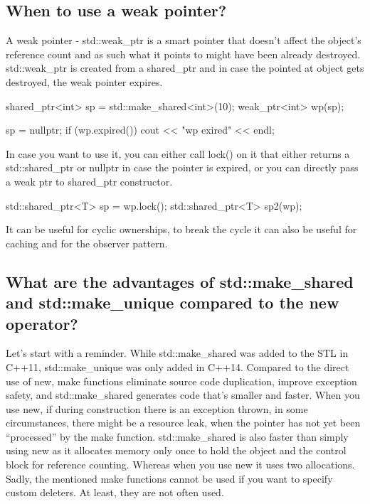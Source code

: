 \documentclass{report}
\begin{document}
\subsection{When to use a weak pointer?}
\bigbreak \noindent 
A weak pointer - std::weak\_ptr is a smart pointer that doesn’t
affect the object’s reference count and as such what it points to
might have been already destroyed.
\bigbreak \noindent 
std::weak\_ptr is created from a shared\_ptr and in case the pointed
at object gets destroyed, the weak pointer expires.
\bigbreak \noindent 
\begin{cppcode}
    shared_ptr<int> sp = std::make_shared<int>(10);
    weak_ptr<int> wp(sp);

    sp = nullptr;
    if (wp.expired()) {
        cout << "wp exired" << endl;
    }
\end{cppcode}
\bigbreak \noindent 
In case you want to use it, you can either call lock() on it that either
returns a std::shared\_ptr or nullptr in case the pointer is expired,
or you can directly pass a weak ptr to shared\_ptr constructor.
\bigbreak \noindent 
\begin{cppcode}
std::shared_ptr<T> sp = wp.lock();
std::shared_ptr<T> sp2(wp);
\end{cppcode}
\bigbreak \noindent 
It can be useful for cyclic ownerships, to break the cycle
\bigbreak \noindent 
it can also be useful for caching and for the observer pattern.
\bigbreak \noindent 
\subsection{What are the advantages of std::make\_shared and std::make\_unique compared to the new operator?}
\bigbreak \noindent 
Let’s start with a reminder. While std::make\_shared was added to
the STL in C++11, std::make\_unique was only added in C++14.
\bigbreak \noindent 
Compared to the direct use of new, make functions eliminate source
code duplication, improve exception safety, and std::make\_shared
generates code that’s smaller and faster.
\bigbreak \noindent 
When you use new, if during construction there is an exception
thrown, in some circumstances, there might be a resource leak,
when the pointer has not yet been “processed” by the make function.
\bigbreak \noindent 
std::make\_shared is also faster than simply using new as it allocates
memory only once to hold the object and the control block for reference counting. Whereas when you use new it uses two allocations.
\bigbreak \noindent 
Sadly, the mentioned make functions cannot be used if you want to
specify custom deleters. At least, they are not often used.
\end{document}
